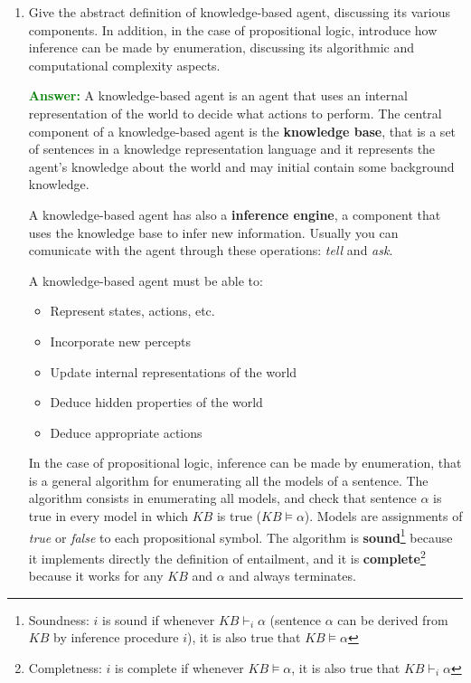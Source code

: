 \documentclass[12pt]{article}
\begin{document}
\begin{enumerate}[label=\textbf{PL.\arabic*}]
    \item Give the abstract definition of knowledge-based agent, discussing its various components. 
    In addition, in the case of propositional logic, introduce how inference can be made by enumeration, discussing its algorithmic and computational complexity aspects.
    
    \textcolor{green}{\textbf{Answer:}}
    A knowledge-based agent is an agent that uses an internal representation of the world to decide what actions to perform.
    The central component of a knowledge-based agent is the \textbf{knowledge base}, 
    that is a set of sentences in a knowledge representation language 
    and it represents the agent's knowledge about the world and may initial contain some background knowledge.

    A knowledge-based agent has also a \textbf{inference engine}, a component that uses the knowledge base to infer new information.
    Usually you can comunicate with the agent through these operations: \textit{tell} and \textit{ask}.

    A knowledge-based agent must be able to:
    \begin{itemize}
        \item Represent states, actions, etc.
        \item Incorporate new percepts
        \item Update internal representations of the world
        \item Deduce hidden properties of the world
        \item Deduce appropriate actions
    \end{itemize}

    In the case of propositional logic, inference can be made by enumeration, that is a general algorithm for enumerating all the models of a sentence.
    The algorithm consists in enumerating all models, and check that sentence $\alpha$ is true in every model in which $KB$ is true ($KB\vDash \alpha$).
    Models are assignments of \textit{true} or \textit{false} to each propositional symbol.
    The algorithm is \textbf{sound}\footnote{Soundness: $i$ is sound if whenever $KB\vdash_i\alpha$ 
    (sentence $\alpha$ can be derived from $KB$ by inference procedure $i$), it is also true that $KB\vDash\alpha$ } because it implements directly the definition of entailment, 
    and it is \textbf{complete}\footnote{Completness: $i$ is complete if whenever $KB\vDash\alpha$, it is also true that $KB\vdash_i\alpha$} because it works for any $KB$ and $\alpha$ and always terminates.


\end{enumerate}
\end{document}
